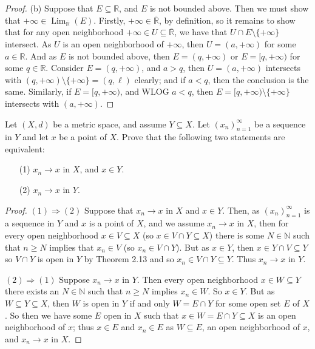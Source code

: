 \documentclass[10pt,reqno]{amsart}
\theoremstyle{definition}
\DeclareMathOperator{\Lim}{Lim}
\newcommand{\rr}{\mathbb R}
\newcommand{\nn}{\mathbb N}
\begin{document}
\begin{tcolorbox}[colback=black!5!white,colframe=black!75!black,title= Chapter 4: Exercise 1.3.]
\begin{proof}
(b) Suppose that $E \subseteq \rr$, and $E$ is not bounded above. Then we must show that $+ \infty \in \Lim_{\overline{\rr}} (E)$. Firstly, $+\infty \in \overline{\rr}$, by definition, so it remains to show that for any open neighborhood $ +\infty \in U \subseteq \overline{\rr}$, we have that $U \cap E \setminus \{+\infty \}$ intersect. As $U$ is an open neighborhood of $+\infty$, then $U = (a, +\infty)$ for some $a \in \rr$. And as $E$ is not bounded above, then $E = (q, +\infty)$ or $E = [q, + \infty)$ for some $q \in \rr$. Consider $E = (q, + \infty)$, and $a >q$, then $U = (a, + \infty)$ intersects with $(q, +\infty) \setminus \{ + \infty \} = (q, \ell)$ clearly; and if $a<q$, then the conclusion is the same. Similarly, if $E = [q, + \infty)$, and WLOG $a <q$, then $E=[q, +\infty) \setminus \{ + \infty \}$ intersects with $(a, + \infty)$.
\end{proof}
\end{tcolorbox}

\begin{tcolorbox}[colback=black!5!white,colframe=black!75!black,title= Chapter 4: Exercise 1.4.]
Let $(X,d)$ be a metric space, and assume $Y \subseteq X$. Let $(x_n)^\infty_{n=1}$ be a sequence in $Y$ and let $x$ be a point of $X$. Prove that the following two statements are equivalent:
\begin{itemize}
	\item [(1)] $x_n \to x$ in $X$, and $x \in Y$.
	\item [(2)] $x_n \to x$ in $Y$.
\end{itemize}
\tcblower 
\begin{proof}
	$(1) \Rightarrow (2)$ Suppose that $x_n \to x$ in $X$ and  $x \in Y$. Then, as $(x_n)_{n=1}^\infty$ is a sequence in $Y$ and $x$ is a point of $X$, and we assume $x_n \to x$ in $X$, then for every open neighborhood $x \in V \subseteq X$ (so $x \in V \cap Y \subseteq X$) there is some $N \in \nn$ such that $n \geq N$ implies that $x_n \in V$ (so $x_n \in V \cap Y$). But as $x \in Y$, then $x \in Y \cap V \subseteq Y$ so $V \cap Y$ is open in $Y$ by Theorem 2.13 and so $x_n \in V \cap Y \subseteq Y$. Thus $x_n \to x$ in $Y$.
	
	$(2) \Rightarrow (1)$ Suppose $x_n \to x$ in $Y$. Then every open neighborhood $x \in W \subseteq Y$ there exists an $N \in \nn$ such that $n \geq N$ implies $x_n \in W$. So $x \in Y$. But as $W \subseteq Y \subseteq X$, then $W$ is open in $Y$ if and only $W = E \cap Y$ for some open set $E$ of $X$. So then we have some $E$ open in $X$ such that $x \in W = E \cap Y \subseteq X$ is an open neighborhood of $x$; thus $x \in E$ and $x_n \in E$ as $W \subseteq E$, an open neighborhood of $x$, and $x_n \to x$ in $X$.
\end{proof}
\end{tcolorbox}
\end{document}
